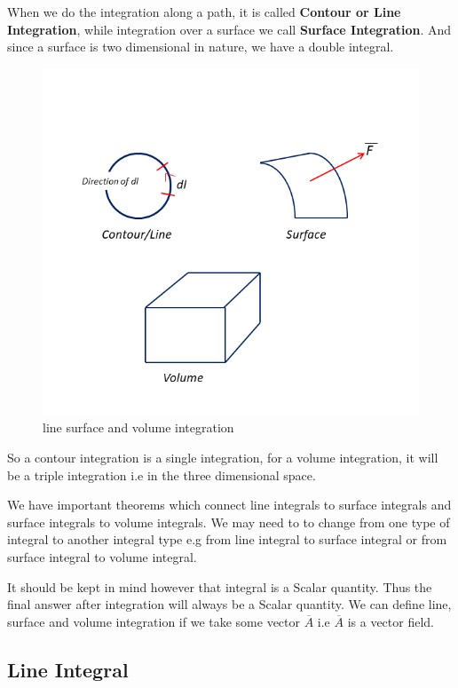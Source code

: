 When we do the integration along a path, it is called \textbf{Contour or Line Integration}, while integration over a surface we call \textbf{Surface Integration}. And since a surface is two dimensional in nature, we have a double integral.

\begin{figure}[h]
	\centering
	\includegraphics[width=1\linewidth]{./graphics/fig17.3}
	\caption{line surface and volume integration}
\end{figure}

So a contour integration is a single integration, for a volume integration, it will be a triple integration i.e in the three dimensional space.

We have important theorems which connect line integrals to surface integrals and surface integrals to volume integrals. We may need to to change from one type of integral to another integral type e.g from line integral to surface integral or from surface integral to volume integral.

It should be kept in mind however that integral is a Scalar quantity. Thus the final answer after integration will always be a Scalar quantity. We can define line, surface and volume integration if we take some vector $\overline{A}$ i.e $\overline{A}$ is a vector field. 

\subsection{Line Integral}

